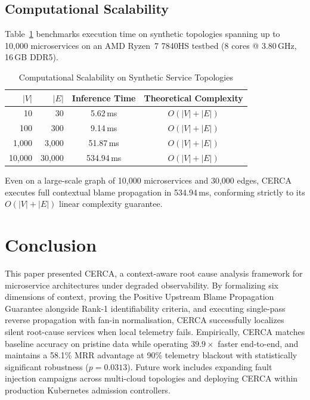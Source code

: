 \documentclass[conference]{IEEEtran}
\begin{document}
\subsection{Computational Scalability}
Table~\ref{tab:scalability} benchmarks execution time on synthetic topologies spanning up to 10{,}000 microservices on an AMD Ryzen~7 7840HS testbed (8 cores @ 3.80\,GHz, 16\,GB DDR5).

\begin{table}[!t]
\renewcommand{\arraystretch}{1.15}
\caption{Computational Scalability on Synthetic Service Topologies}
\label{tab:scalability}
\centering
\footnotesize
\setlength{\tabcolsep}{8pt}
\begin{tabular}{rrcc}
\toprule
$|V|$ & $|E|$ & Inference Time & Theoretical Complexity \\
\midrule
10 & 30 & 5.62\,ms & $O(|V|+|E|)$ \\
100 & 300 & 9.14\,ms & $O(|V|+|E|)$ \\
1{,}000 & 3{,}000 & 51.87\,ms & $O(|V|+|E|)$ \\
10{,}000 & 30{,}000 & 534.94\,ms & $O(|V|+|E|)$ \\
\bottomrule
\end{tabular}
\end{table}

Even on a large-scale graph of 10{,}000 microservices and 30{,}000 edges, CERCA executes full contextual blame propagation in 534.94\,ms, conforming strictly to its $O(|V|+|E|)$ linear complexity guarantee.

\section{Conclusion}

This paper presented CERCA, a context-aware root cause analysis framework for microservice architectures under degraded observability. By formalizing six dimensions of context, proving the Positive Upstream Blame Propagation Guarantee alongside Rank-1 identifiability criteria, and executing single-pass reverse propagation with fan-in normalisation, CERCA successfully localizes silent root-cause services when local telemetry fails. Empirically, CERCA matches baseline accuracy on pristine data while operating $39.9\times$ faster end-to-end, and maintains a 58.1\% MRR advantage at 90\% telemetry blackout with statistically significant robustness ($p=0.0313$). Future work includes expanding fault injection campaigns across multi-cloud topologies and deploying CERCA within production Kubernetes admission controllers.
\end{document}
